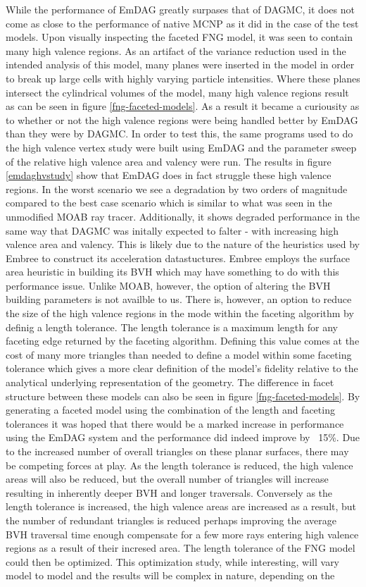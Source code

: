\documentclass[12pt, a4paper]{article}
\begin{document}
While the performance of EmDAG greatly surpases that of DAGMC, it does not come as close to the performance of native MCNP as it did in the case of the test models. Upon visually inspecting the faceted FNG model, it was seen to contain many high valence regions. As an artifact of the variance reduction used in the intended analysis of this model, many planes were inserted in the model in order to break up large cells with highly varying particle intensities. Where these planes intersect the cylindrical volumes of the model, many high valence regions result as can be seen in figure \ref{fng-faceted-models}. As a result it became a curiousity as to whether or not the high valence regions were being handled better by EmDAG than they were by DAGMC. In order to test this, the same programs used to do the high valence vertex study were built using EmDAG and the parameter sweep of the relative high valence area and valency were run. The results in figure \ref{emdaghvstudy} show that EmDAG does in fact struggle these high valence regions. In the worst scenario we see a degradation by two orders of magnitude compared to the best case scenario which is similar to what was seen in the unmodified MOAB ray tracer. Additionally, it shows degraded performance in the same way that DAGMC was initally expected to falter - with increasing high valence area and valency. This is likely due to the nature of the heuristics used by Embree to construct its acceleration datastuctures. Embree employs the surface area heuristic in building its BVH which may have something to do with this performance issue. Unlike MOAB, however, the option of altering the BVH building parameters is not availble to us. There is, however, an option to reduce the size of the high valence regions in the mode within the faceting algorithm by definig a length tolerance. The length tolerance is a maximum length for any faceting edge returned by the faceting algorithm. Defining this value comes at the cost of many more triangles than needed to define a model within some faceting tolerance which gives a more clear definition of the model's fidelity relative to the analytical underlying representation of the geometry. The difference in facet structure between these models can also be seen in figure \ref{fng-faceted-models}. By generating a faceted model using the combination of the length and faceting tolerances it was hoped that there would be a marked increase in performance using the EmDAG system and the performance did indeed improve by ~15\%. Due to the increased number of overall triangles on these planar surfaces, there may be competing forces at play. As the length tolerance is reduced, the high valence areas will also be reduced, but the overall number of triangles will increase resulting in inherently deeper BVH and longer traversals. Conversely as the length tolerance is increased, the high valence areas are increased as a result, but the number of redundant triangles is reduced perhaps improving the average BVH traversal time enough compensate for a few more rays entering high valence regions as a result of their incresed area. The length tolerance of the FNG model could then be optimized. This optimization study, while interesting, will vary model to model and the results will be complex in nature, depending on the 
\end{document}
